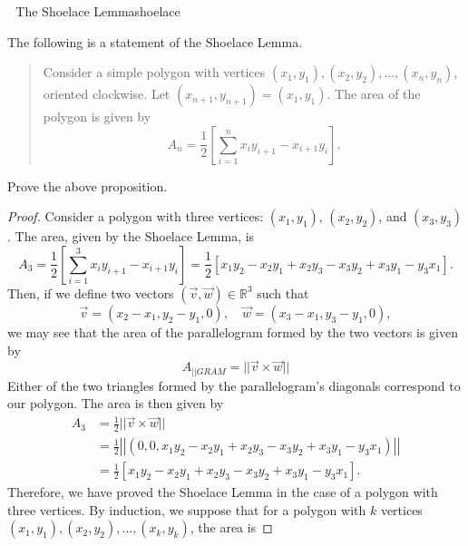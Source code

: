     \pagebreak
    \begin{exercise}{\Difficulty\,\Difficulty\,\Difficulty\,\,The Shoelace Lemma}{shoelace}
    
        The following is a statement of the Shoelace Lemma.
        \begin{quote}
            Consider a simple polygon with vertices \((x_1, y_1), (x_2, y_2), \ldots, (x_n, y_n)\), oriented clockwise. Let \((x_{n+1}, y_{n+1})=(x_1, y_1)\). The area of the polygon is given by
            \begin{equation*}
                A_n=\frac{1}{2}\left[\sum_{i=1}^n x_iy_{i+1}-x_{i+1}y_i \right].
            \end{equation*}
        \end{quote}
        Prove the above proposition.
        \begin{proof}
            Consider a polygon with three vertices: \((x_1, y_1)\), \((x_2, y_2)\), and \((x_3, y_3)\). The area, given by the Shoelace Lemma, is
            \begin{equation*}
                A_3=\frac{1}{2}\left[\sum_{i=1}^3 x_iy_{i+1}-x_{i+1}y_i \right]=\frac{1}{2}\left[x_1y_2-x_2y_1+x_2y_3-x_3y_2+x_3y_1-y_3x_1\right].
            \end{equation*}
            Then, if we define two vectors \((\vec{v},\vec{w})\in\mathbb{R}^3\) such that
            \begin{equation*}
                \vec{v}=(x_2-x_1, y_2-y_1, 0),\quad\vec{w}=(x_3-x_1, y_3-y_1, 0),
            \end{equation*}
            we may see that the area of the parallelogram formed by the two vectors is given by
            \begin{equation*}
                A_{||GRAM}=||\vec{v} \times \vec{w}||
            \end{equation*}
            Either of the two triangles formed by the parallelogram's diagonals correspond to our polygon. The area is then given by
            \begin{align*}
                A_3&=\frac{1}{2}||\vec{v} \times \vec{w}|| \\
                &=\frac{1}{2}\left|\left|(0, 0, x_1y_2-x_2y_1+x_2y_3-x_3y_2+x_3y_1-y_3x_1)\right|\right| \\
                &=\frac{1}{2}\left[x_1y_2-x_2y_1+x_2y_3-x_3y_2+x_3y_1-y_3x_1\right].
            \end{align*}
            Therefore, we have proved the Shoelace Lemma in the case of a polygon with three vertices. By induction, we suppose that for a polygon with \(k\) vertices \((x_1, y_1), (x_2, y_2), \ldots, (x_k, y_k)\), the area is

\end{proof}
\end{exercise}
